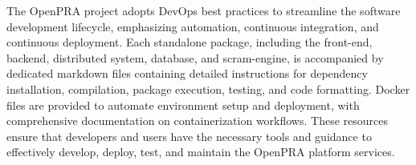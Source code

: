 The OpenPRA project adopts DevOps best practices to streamline the software development lifecycle, emphasizing automation, continuous integration, and continuous deployment. Each standalone package, including the front-end, backend, distributed system, database, and scram-engine, is accompanied by dedicated markdown files containing detailed instructions for dependency installation, compilation, package execution, testing, and code formatting. Docker files are provided to automate environment setup and deployment, with comprehensive documentation on containerization workflows. These resources ensure that developers and users have the necessary tools and guidance to effectively develop, deploy, test, and maintain the OpenPRA platform services.
